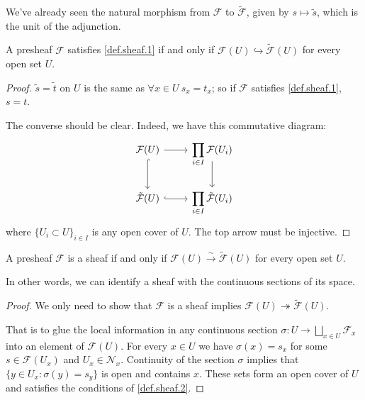 We've already seen the natural morphism from $\mathcal{F}$ to $\tilde{\mathcal{F}}$, given by $s\mapsto\tilde{s}$, which is the unit of the adjunction. 

\begin{theorem}\label{thm.shff.inj}
    A presheaf $\mathcal{F}$ satisfies \ref{def.sheaf.1} if and only if $\mathcal{F}(U)\hookrightarrow\tilde{\mathcal{F}}(U)$ for every open set $U$.
\end{theorem}

\begin{proof}
    $\tilde{s}=\tilde{t}$ on $U$ is the same as $\forall x\in U\ s_x=t_x$; so if $\mathcal{F}$ satisfies \ref{def.sheaf.1}, $s=t$.
    
    The converse should be clear. Indeed, we have this commutative diagram:
    \[ \begin{tikzcd}
        \mathcal{F}(U) \arrow[r] \arrow[d, hook] & \displaystyle\prod_{i\in I}\mathcal{F}(U_i) \arrow[d, start anchor={[yshift=2ex]}] \\
        \tilde{\mathcal{F}}(U) \arrow[r, hook] & \displaystyle\prod_{i\in I}\tilde{\mathcal{F}}(U_i)
    \end{tikzcd} \]
    \noindent where $\{U_i\subset U\}_{i\in I}$ is any open cover of $U$.
    The top arrow must be injective.
\end{proof}

\begin{theorem}\label{thm.shff.iso}
    A presheaf $\mathcal{F}$ is a sheaf if and only if $\mathcal{F}(U)\xrightarrow{\sim}\tilde{\mathcal{F}}(U)$ for every open set $U$.

    In other words, we can identify a sheaf with the continuous sections of its \etale space.
\end{theorem}

\begin{proof}
    We only need to show that $\mathcal{F}$ is a sheaf implies $\mathcal{F}(U)\twoheadrightarrow\tilde{\mathcal{F}}(U)$.

    That is to glue the local information in any continuous section $\sigma:U\to\bigsqcup_{x\in U}\mathcal{F}_x$ into an element of $\mathcal{F}(U)$. For every $x\in U$ we have $\sigma(x)=s_x$ for some $s\in\mathcal{F}(U_x)$ and $U_x\in\mathcal{N}_x$. Continuity of the section $\sigma$ implies that $\{y\in U_x:\sigma(y)=s_y\}$ is open and contains $x$. These sets form an open cover of $U$ and satisfies the conditions of \ref{def.sheaf.2}.
\end{proof}

